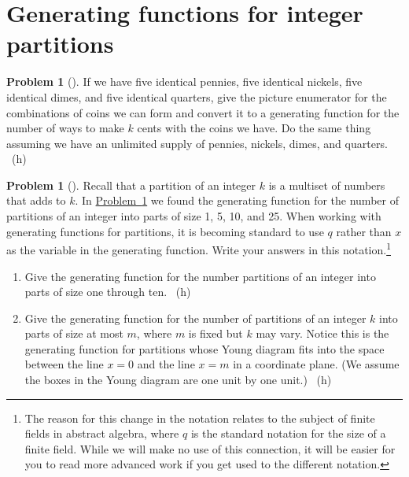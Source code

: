 \documentclass[10pt,]{book}
\theoremstyle{plain}
\theoremstyle{definition}
\newtheorem{activity}[project]{Problem}
\theoremstyle{definition}
\numberwithin{equation}{chapter}
\begin{document}
\section[{Generating functions for integer partitions}]{Generating functions for integer partitions}\label{sec_genfns-int-parts}
\begin{activity}[] \label{change-making}
\hypertarget{p-1138}{}%
If we have five identical pennies, five identical nickels, five identical dimes, and five identical quarters, give the picture enumerator for the combinations of coins we can form and convert it to a generating function for the number of ways to make \(k\) cents with the coins we have. Do the same thing assuming we have an unlimited supply of pennies, nickels, dimes, and quarters.%
~{\tiny (h)}\end{activity}
\begin{activity}[] \label{activity-201}
\hypertarget{p-1143}{}%
Recall that a partition of an integer \(k\) is a multiset of numbers that adds to \(k\). In \hyperref[change-making]{Problem~\ref{change-making}} we found the generating function for the number of partitions of an integer into parts of size 1, 5, 10, and 25. When working with generating functions for partitions, it is becoming standard to use \(q\) rather than \(x\) as the variable in the generating function.  Write your answers in this notation.\footnote{The reason for this change in the notation relates to the subject of finite fields in abstract algebra, where \(q\) is the standard notation for the size of a finite field.  While we will make no use of this connection, it will be easier for you to read more advanced work if you get used to the different notation.\label{fn-13}}%
\begin{enumerate}[font=\bfseries,label=(\alph*),ref=\alph*]
\item\label{task-139} \marginsymbol[-2.5em]{} \hypertarget{p-1144}{}%
Give the generating function for the number partitions of an integer into parts of size one through ten.%
~{\tiny (h)}\item\label{largestpartatmostm} \marginsymbol[-2.5em]{} \hypertarget{p-1147}{}%
Give the generating function for the number of partitions of an integer \(k\) into parts of size at most \(m\), where \(m\) is fixed but \(k\) may vary. Notice this is the generating function for partitions whose Young diagram fits into the space between the line \(x=0\) and the line \(x=m\) in a coordinate plane. (We assume the boxes in the Young diagram are one unit by one unit.)%
~{\tiny (h)}\end{enumerate}
\end{activity}
\end{document}
